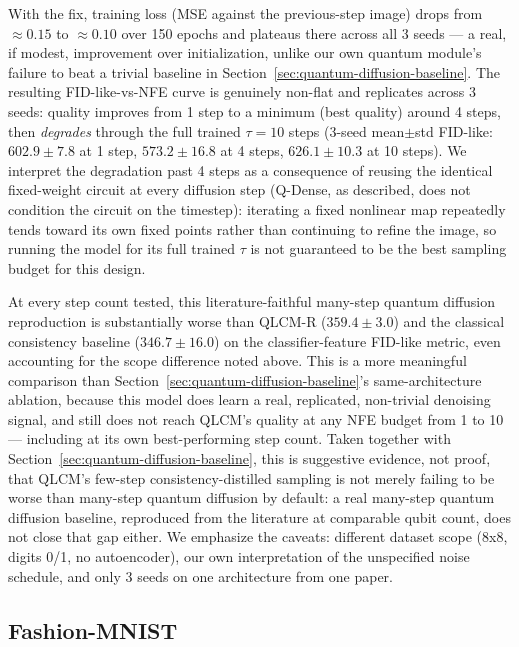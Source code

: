 \documentclass[11pt]{article}
\begin{document}
With the fix, training loss (MSE against the previous-step image) drops from
$\approx0.15$ to $\approx0.10$ over 150 epochs and plateaus there across all
3 seeds --- a real, if modest, improvement over initialization, unlike our
own quantum module's failure to beat a trivial baseline in
Section~\ref{sec:quantum-diffusion-baseline}. The resulting FID-like-vs-NFE
curve is genuinely non-flat and replicates across 3 seeds: quality improves
from 1 step to a minimum (best quality) around 4 steps, then \emph{degrades}
through the full trained $\tau=10$ steps (3-seed mean$\pm$std FID-like:
$602.9\pm7.8$ at 1 step, $573.2\pm16.8$ at 4 steps, $626.1\pm10.3$ at 10
steps). We interpret the degradation past 4 steps as a consequence of reusing
the identical fixed-weight circuit at every diffusion step (Q-Dense, as
described, does not condition the circuit on the timestep): iterating a
fixed nonlinear map repeatedly tends toward its own fixed points rather than
continuing to refine the image, so running the model for its full trained
$\tau$ is not guaranteed to be the best sampling budget for this design.

At every step count tested, this literature-faithful many-step quantum
diffusion reproduction is substantially worse than QLCM-R ($359.4\pm3.0$) and
the classical consistency baseline ($346.7\pm16.0$) on the classifier-feature
FID-like metric, even accounting for the scope difference noted above. This
is a more meaningful comparison than Section~\ref{sec:quantum-diffusion-baseline}'s
same-architecture ablation, because this model does learn a real, replicated,
non-trivial denoising signal, and still does not reach QLCM's quality at any
NFE budget from 1 to 10 --- including at its own best-performing step count.
Taken together with Section~\ref{sec:quantum-diffusion-baseline}, this is
suggestive evidence, not proof, that QLCM's few-step consistency-distilled
sampling is not merely failing to be worse than many-step quantum diffusion
by default: a real many-step quantum diffusion baseline, reproduced from the
literature at comparable qubit count, does not close that gap either. We
emphasize the caveats: different dataset scope (8x8, digits 0/1, no
autoencoder), our own interpretation of the unspecified noise schedule, and
only 3 seeds on one architecture from one paper.

\subsection{Fashion-MNIST}
\label{sec:fmnist-results}
\end{document}
